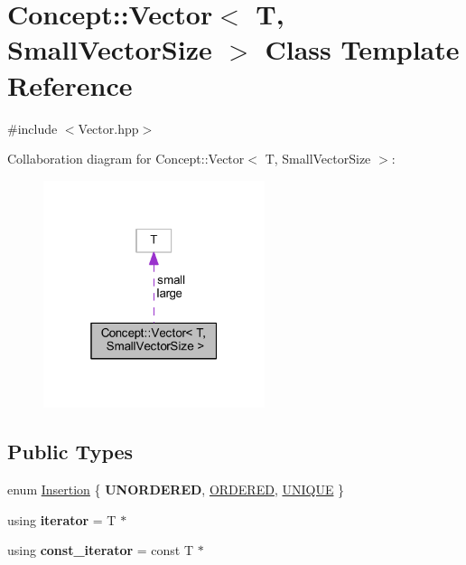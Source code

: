 \hypertarget{class_concept_1_1_vector}{}\section{Concept\+::Vector$<$ T, Small\+Vector\+Size $>$ Class Template Reference}
\label{class_concept_1_1_vector}


{\ttfamily \#include $<$Vector.\+hpp$>$}



Collaboration diagram for Concept\+::Vector$<$ T, Small\+Vector\+Size $>$\+:\nopagebreak
\begin{figure}[H]
\begin{center}
\leavevmode
\includegraphics[width=184pt]{class_concept_1_1_vector__coll__graph}
\end{center}
\end{figure}
\subsection*{Public Types}
\begin{DoxyCompactItemize}
\item 
enum \mbox{\hyperlink{class_concept_1_1_vector_a279e17ea7182680f811e238bebb84232}{Insertion}} \{ {\bfseries U\+N\+O\+R\+D\+E\+R\+ED}, 
\mbox{\hyperlink{class_concept_1_1_vector_a279e17ea7182680f811e238bebb84232abe7a0ac5e472b74b4bdc9c634c6c0fc3}{O\+R\+D\+E\+R\+ED}}, 
\mbox{\hyperlink{class_concept_1_1_vector_a279e17ea7182680f811e238bebb84232a6fd8fe1cd97c112ec879b5e2167a94f4}{U\+N\+I\+Q\+UE}}
 \}
\item 
\mbox{\label{class_concept_1_1_vector_a512818318beb13e5f8d4e3f2bb381c7b}} 
using {\bfseries iterator} = T $\ast$
\item 
\mbox{\label{class_concept_1_1_vector_a7c025d244bbe6a841da65171170b5bde}} 
using {\bfseries const\+\_\+iterator} = const T $\ast$
\end{DoxyCompactItemize}
